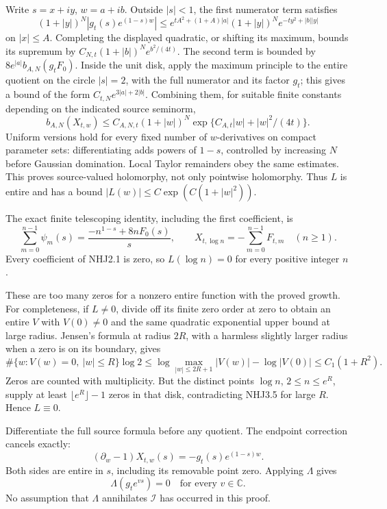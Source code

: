 Write \(s=x+iy\), \(w=a+ib\). Outside \(|s|<1\), the first numerator
term satisfies \[
(1+|y|)^N|g_t(s)e^{(1-s)w}|
\le e^{tA^2+(1+A)|a|}(1+|y|)^N e^{-ty^2+|b||y|}
\tag{NHJ3.2}
\] on \(|x|\le A\). Completing the displayed quadratic, or shifting its
maximum, bounds its supremum by \(C_{N,t}(1+|b|)^N e^{b^2/(4t)}\). The
second term is bounded by \(8e^{|a|}b_{A,N}(g_tF_0)\). Inside the unit
disk, apply the maximum principle to the entire quotient on the circle
\(|s|=2\), with the full numerator and its factor \(g_t\); this gives a
bound of the form \(C_{t,N}e^{3|a|+2|b|}\). Combining them, for suitable
finite constants depending on the indicated source seminorm, \[
b_{A,N}(X_{t,w})\le C_{A,N,t}(1+|w|)^N
\exp\{C_{A,t}|w|+|w|^2/(4t)\}.
\tag{NHJ3.3}
\] Uniform versions hold for every fixed number of \(w\)-derivatives on
compact parameter sets: differentiating adds powers of \(1-s\),
controlled by increasing \(N\) before Gaussian domination. Local Taylor
remainders obey the same estimates. This proves source-valued
holomorphy, not only pointwise holomorphy. Thus \(L\) is entire and has
a bound \(|L(w)|\le C\exp(C(1+|w|^2))\).

The exact finite telescoping identity, including the first coefficient,
is \[
\sum_{m=0}^{n-1}\psi_m(s)
=\frac{-n^{1-s}+8nF_0(s)}s,
\qquad X_{t,\log n}=-\sum_{m=0}^{n-1}F_{t,m}
\quad(n\ge1).
\tag{NHJ3.4}
\] Every coefficient of NHJ2.1 is zero, so \(L(\log n)=0\) for every
positive integer \(n\).

These are too many zeros for a nonzero entire function with the proved
growth. For completeness, if \(L\ne0\), divide off its finite zero order
at zero to obtain an entire \(V\) with \(V(0)\ne0\) and the same
quadratic exponential upper bound at large radius. Jensen's formula at
radius \(2R\), with a harmless slightly larger radius when a zero is on
its boundary, gives \[
\#\{w:V(w)=0,\ |w|\le R\}\log2
\le \log\max_{|w|\le2R+1}|V(w)|-\log|V(0)|
\le C_1(1+R^2).
\tag{NHJ3.5}
\] Zeros are counted with multiplicity. But the distinct points
\(\log n\), \(2\le n\le e^R\), supply at least \(\lfloor e^R\rfloor-1\)
zeros in that disk, contradicting NHJ3.5 for large \(R\). Hence
\(L\equiv0\).

Differentiate the full source formula before any quotient. The endpoint
correction cancels exactly: \[
(\partial_w-1)X_{t,w}(s)
=-g_t(s)e^{(1-s)w}.
\tag{NHJ3.6}
\] Both sides are entire in \(s\), including its removable point zero.
Applying \(\Lambda\) gives \[
\boxed{\Lambda(g_t e^{vs})=0\quad\text{for every }v\in\mathbb C.}
\tag{NHJ3.7}
\] No assumption that \(\Lambda\) annihilates \(\mathcal I\) has
occurred in this proof.

